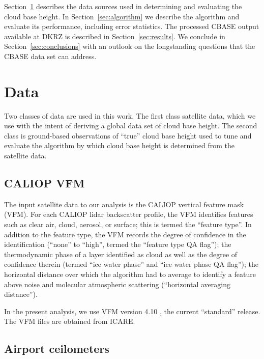 \documentclass[amt,manuscript]{copernicus}\usepackage[]{graphicx}\usepackage[]{color}
\newcommand{\hlnum}[1]{\textcolor[rgb]{0.686,0.059,0.569}{#1}}%
\newcommand\comment[2]{\{\hlnum{ \textit{#1}: #2}\}}
\newcommand\commentjm[1]{\comment{$j_\mu$}{#1}}
\begin{document}
Section~\ref{sec:data} describes the data sources used in determining and
evaluating the cloud base height.  In Section~\ref{sec:algorithm} we describe
the algorithm and evaluate its performance, including error statistics.  The
processed CBASE output available at DKRZ is described in
Section~\ref{sec:results}.  We conclude in Section~\ref{sec:conclusions} with an
outlook on the longstanding questions that the CBASE data set can address.

\section{Data}
\label{sec:data}

Two classes of data are used in this work.  The first class satellite data,
which we use with the intent of deriving a global data set of cloud base height.
The second class is ground-based observations of ``true'' cloud base height used
to tune and evaluate the algorithm by which cloud base height is determined from
the satellite data.

\subsection{CALIOP VFM}

The input satellite data to our analysis is the CALIOP vertical feature mask
(VFM).  For each CALIOP lidar backscatter profile, the VFM identifies features
such as clear air, cloud, aerosol, or surface; this is termed the ``feature
type''.  In addition to the feature type, the VFM records the degree of
confidence in the identification (``none'' to ``high'', termed the ``feature
type QA flag''); the thermodynamic phase of a layer identified as cloud as well
as the degree of confidence therein (termed ``ice water phase'' and ``ice water
phase QA flag''); the horizontal distance over which the algorithm had to
average to identify a feature above noise and molecular atmospheric scattering
(``horizontal averaging distance'').  

In the present analysis, we use VFM version 4.10 \citep{Caliop}, the current
``standard'' release.  The VFM files are obtained from ICARE.

\subsection{Airport ceilometers}
\end{document}
